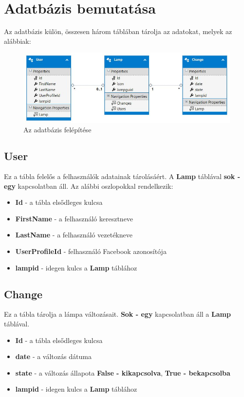 \documentclass[a4paper,12pt]{report}
\begin{document}
\section{Adatbázis bemutatása}
    Az adatbázis külön, összesen három táblában tárolja az adatokat, melyek az alábbiak:

\begin{figure}[H]
    \centering
    \includegraphics[width=\linewidth]{images/database.jpg}
    \caption{Az adatbázis felépítése}
    \label{fig: Database}
\end{figure}

\subsection{User}
    Ez a tábla felelős a felhasználók adatainak tárolásáért. A \textbf{Lamp} táblával \textbf{sok - egy} kapcsolatban áll. Az alábbi
    oszlopokkal rendelkezik:

\begin{itemize}
    \item \textbf{Id} - a tábla elsődleges kulcsa
    \item \textbf{FirstName} - a felhasználó keresztneve
    \item \textbf{LastName} - a felhasználó vezetékneve
    \item \textbf{UserProfileId} - felhasználó Facebook azonosítója
    \item \textbf{lampid} - idegen kulcs a \textbf{Lamp} táblához
\end{itemize}

\subsection{Change}
    Ez a tábla tárolja a lámpa változásait. \textbf{Sok - egy} kapcsolatban áll a \textbf{Lamp} táblával.

\begin{itemize}
    \item \textbf{Id} - a tábla elsődleges kulcsa
    \item \textbf{date} - a változás dátuma
    \item \textbf{state} - a változás állapota \textbf{False - kikapcsolva}, \textbf{True - bekapcsolba}
    \item \textbf{lampid} - idegen kulcs a \textbf{Lamp} táblához
\end{itemize}
\end{document}
